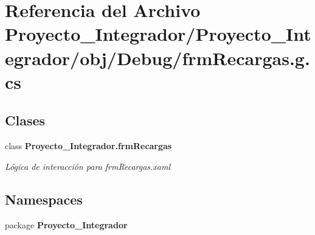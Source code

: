 \section{Referencia del Archivo Proyecto\-\_\-\-Integrador/\-Proyecto\-\_\-\-Integrador/obj/\-Debug/frm\-Recargas.g.\-cs}
\label{frm_recargas_8g_8cs}
\subsection*{Clases}
\begin{DoxyCompactItemize}
\item 
class {\bf Proyecto\-\_\-\-Integrador.\-frm\-Recargas}
\begin{DoxyCompactList}\small\item\em Lógica de interacción para frm\-Recargas.\-xaml \end{DoxyCompactList}\end{DoxyCompactItemize}
\subsection*{Namespaces}
\begin{DoxyCompactItemize}
\item 
package {\bf Proyecto\-\_\-\-Integrador}
\end{DoxyCompactItemize}
